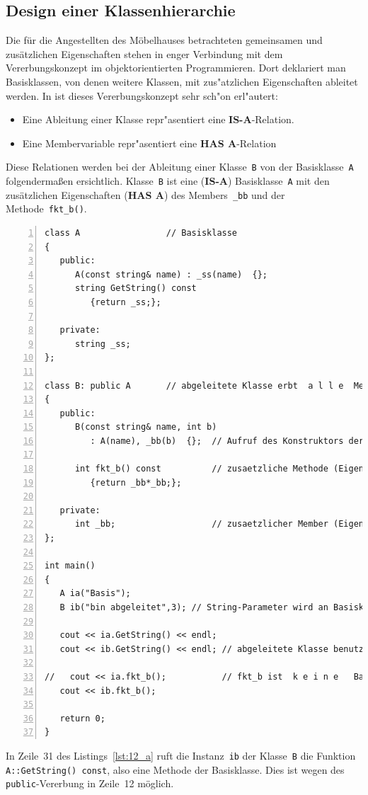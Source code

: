 \subsection{Design einer Klassenhierarchie}
\label{sec:A1.1}
%
Die für die Angestellten des Möbelhauses betrachteten gemeinsamen und zusätzlichen Eigenschaften 
stehen in enger Verbindung mit dem Vererbungskonzept im
objektorientierten Programmieren.
Dort deklariert man Basisklassen, von denen weitere Klassen,
mit zus"atzlichen Eigenschaften ableitet werden.
In \cite[\S8.2]{Schmaranz:2002:SCP} ist dieses Vererbungskonzept sehr
sch"on erl"autert:
\begin{itemize}
 \item Eine Ableitung einer Klasse repr"asentiert
 	eine \textbf{IS-A}-Relation.
 \item Eine Membervariable repr"asentiert
 	eine \textbf{HAS A}-Relation
\end{itemize}
%
Diese Relationen werden bei der Ableitung einer Klasse~\texttt{B} von der Basisklasse~\texttt{A} folgendermaßen ersichtlich.
Klasse~\texttt{B} ist eine (\textbf{IS-A}) Basisklasse~\texttt{A} mit den zusätzlichen Eigenschaften (\textbf{HAS A}) 
des Members~\verb|_bb| und der Methode~\verb|fkt_b()|.
%
%
\begin{lstlisting}[caption={Ableitung einer Klasse},label=lst:12_a,
basicstyle=\scriptsize,numbers=left, numberstyle=\tiny, stepnumber=2, numbersep=5pt]
class A                 // Basisklasse
{
   public:
      A(const string& name) : _ss(name)  {};
      string GetString() const
         {return _ss;};
      
   private:
      string _ss;
};

class B: public A       // abgeleitete Klasse erbt  a l l e  Methoden/Member von A
{
   public:
      B(const string& name, int b)
         : A(name), _bb(b)  {};  // Aufruf des Konstruktors der Basisklasse

      int fkt_b() const          // zusaetzliche Methode (Eigenschaft)
         {return _bb*_bb;};
    
   private:
      int _bb;                   // zusaetzlicher Member (Eigenschaft)
};

int main()
{
   A ia("Basis");
   B ib("bin abgeleitet",3); // String-Parameter wird an Basisklasse "durchgereicht"
   
   cout << ia.GetString() << endl;
   cout << ib.GetString() << endl; // abgeleitete Klasse benutzt Basisklassenmethode
   
//   cout << ia.fkt_b();           // fkt_b ist  k e i n e   Basisklassenmethode
   cout << ib.fkt_b();
   
   return 0;
}
\end{lstlisting}
In Zeile~31 des Listings~\ref{lst:12_a} ruft die Instanz~\verb|ib| der Klasse~\texttt{B} 
die Funktion \verb|A::GetString() const|, also eine Methode der Basisklasse. Dies ist wegen 
des \verb|public|-Vererbung in Zeile~12 möglich.



